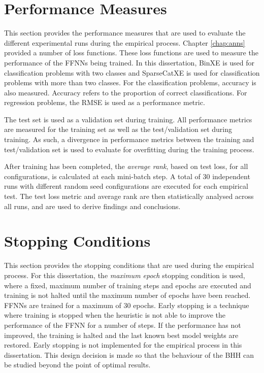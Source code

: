 \section{Performance Measures}\label{sec:methodology:performance_measures}

This section provides the performance measures that are used to evaluate the different experimental runs during the empirical process. Chapter \ref{chap:anns} provided a number of loss functions. These loss functions are used to measure the performance of the \acp{FFNN} being trained. In this dissertation, \acs{BinXE} is used for classification problems with two classes and \acs{SparseCatXE} is used for classification problems with more than two classes. For the classification problems, accuracy is also measured. Accuracy refers to the proportion of correct classifications. For regression problems, the \acs{RMSE} is used as a performance metric.

The test set is used as a validation set during training. All performance metrics are measured for the training set as well as the test/validation set during training. As such, a divergence in performance metrics between the training and test/validation set is used to evaluate for overfitting during the training process.

After training has been completed, the \textit{average rank}, based on test loss, for all configurations, is calculated at each mini-batch step. A total of 30 independent runs with different random seed configurations are executed for each empirical test. The test loss metric and average rank are then statistically analysed across all runs, and are used to derive findings and conclusions.

\section{Stopping Conditions}\label{sec:methodology:stopping_conditions}

This section provides the stopping conditions that are used during the empirical process. For this dissertation, the \textit{maximum epoch} stopping condition is used, where a fixed, maximum number of training steps and epochs are executed and training is not halted until the maximum number of epochs have been reached. \acp{FFNN} are trained for a maximum of 30 epochs. Early stopping is a technique where training is stopped when the heuristic is not able to improve the performance of the \acs{FFNN} for a number of steps. If the performance has not improved, the training is halted and the last known best model weights are restored. Early stopping is not implemented for the empirical process in this dissertation. This design decision is made so that the behaviour of the \acs{BHH} can be studied beyond the point of optimal results.


